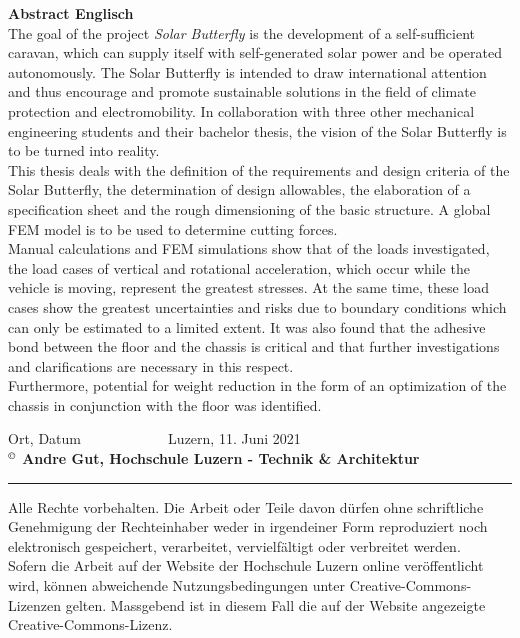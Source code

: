 \textbf{Abstract Englisch}\\
The goal of the project \emph{Solar Butterfly} is the development of a self-sufficient caravan, which can supply itself with self-generated solar power and be operated autonomously. The Solar Butterfly is intended to draw international attention and thus encourage and promote sustainable solutions in the field of climate protection and electromobility. In collaboration with three other mechanical engineering students and their bachelor thesis, the vision of the Solar Butterfly is to be turned into reality.\\
This thesis deals with the definition of the requirements and design criteria of the Solar Butterfly, the determination of design allowables, the elaboration of a specification sheet and the rough dimensioning of the basic structure. A global FEM model is to be used to determine cutting forces.\\
Manual calculations and FEM simulations show that of the loads investigated, the load cases of vertical and rotational acceleration, which occur while the vehicle is moving, represent the greatest stresses. At the same time, these load cases show the greatest uncertainties and risks due to boundary conditions which can only be estimated to a limited extent. It was also found that the adhesive bond between the floor and the chassis is critical and that further investigations and clarifications are necessary in this respect.\\
Furthermore, potential for weight reduction in the form of an optimization of the chassis in conjunction with the floor was identified.

\vspace{2cm}
Ort, Datum $\;\;\;\;\;\;\;\;\;\;\;\;\;\;\;\;\;\;\;\;$ Luzern, 11. Juni 2021\\
\textbf{{\small $^\copyright$} Andre Gut, Hochschule Luzern - Technik \& Architektur}

\vspace*{\fill}

\noindent
\rule{\linewidth}{0.5px}
\begin{footnotesize}
  Alle Rechte vorbehalten. Die Arbeit oder Teile davon dürfen ohne schriftliche Genehmigung der Rechteinhaber weder in irgendeiner Form reproduziert noch elektronisch gespeichert, verarbeitet, vervielfältigt oder verbreitet werden.\\
  Sofern die Arbeit auf der Website der Hochschule Luzern online veröffentlicht wird, können abweichende Nutzungsbedingungen unter Creative-Commons-Lizenzen gelten. Massgebend ist in diesem Fall die auf der Website angezeigte Creative-Commons-Lizenz.
\end{footnotesize}
\newpage

